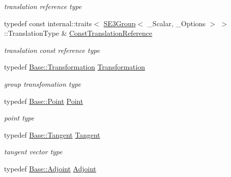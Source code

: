 \begin{DoxyCompactItemize}
\begin{DoxyCompactList}\small\item\em translation reference type \end{DoxyCompactList}\item 
typedef const internal\+::traits$<$ \hyperlink{class_sophus_1_1_s_e3_group}{S\+E3\+Group}$<$ \+\_\+\+Scalar, \+\_\+\+Options $>$ $>$\+::Translation\+Type \& \hyperlink{class_sophus_1_1_s_e3_group_a285d764bd862286f24c8fcde6063b30f}{Const\+Translation\+Reference}\hypertarget{class_sophus_1_1_s_e3_group_a285d764bd862286f24c8fcde6063b30f}{}\label{class_sophus_1_1_s_e3_group_a285d764bd862286f24c8fcde6063b30f}

\begin{DoxyCompactList}\small\item\em translation const reference type \end{DoxyCompactList}\item 
typedef \hyperlink{class_sophus_1_1_s_e3_group_base_a426ebd53f324a4fd6d36c28028f967f1}{Base\+::\+Transformation} \hyperlink{class_sophus_1_1_s_e3_group_a1e2ab900cbb05a8740f6174c57ad0861}{Transformation}\hypertarget{class_sophus_1_1_s_e3_group_a1e2ab900cbb05a8740f6174c57ad0861}{}\label{class_sophus_1_1_s_e3_group_a1e2ab900cbb05a8740f6174c57ad0861}

\begin{DoxyCompactList}\small\item\em group transfomation type \end{DoxyCompactList}\item 
typedef \hyperlink{class_sophus_1_1_s_e3_group_base_aca2cf20e857567b74fb399c7ee76c744}{Base\+::\+Point} \hyperlink{class_sophus_1_1_s_e3_group_ab2257f9298559ef83bbeffd386a50e1d}{Point}\hypertarget{class_sophus_1_1_s_e3_group_ab2257f9298559ef83bbeffd386a50e1d}{}\label{class_sophus_1_1_s_e3_group_ab2257f9298559ef83bbeffd386a50e1d}

\begin{DoxyCompactList}\small\item\em point type \end{DoxyCompactList}\item 
typedef \hyperlink{class_sophus_1_1_s_e3_group_base_a45f63b562f0614853cef2c04c4cd5f2b}{Base\+::\+Tangent} \hyperlink{class_sophus_1_1_s_e3_group_a9c2c8a80c34481adfd749d9e0375f56d}{Tangent}\hypertarget{class_sophus_1_1_s_e3_group_a9c2c8a80c34481adfd749d9e0375f56d}{}\label{class_sophus_1_1_s_e3_group_a9c2c8a80c34481adfd749d9e0375f56d}

\begin{DoxyCompactList}\small\item\em tangent vector type \end{DoxyCompactList}\item 
typedef \hyperlink{class_sophus_1_1_s_e3_group_base_ac2e0179cb3e9490604c417d8e59a92d3}{Base\+::\+Adjoint} \hyperlink{class_sophus_1_1_s_e3_group_a4408133c044df81f3d59397874894a6c}{Adjoint}\hypertarget{class_sophus_1_1_s_e3_group_a4408133c044df81f3d59397874894a6c}{}\label{class_sophus_1_1_s_e3_group_a4408133c044df81f3d59397874894a6c}


\end{DoxyCompactItemize}

